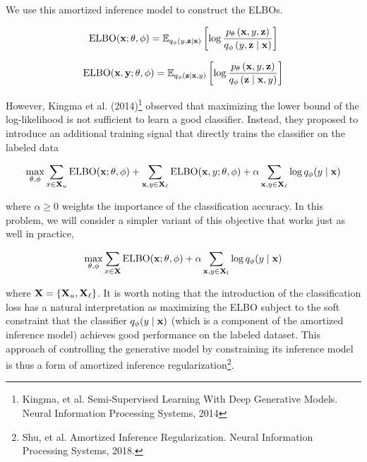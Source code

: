 We use this amortized inference model to construct the ELBOs.

\begin{equation} \label{eq:24}
    \text{ELBO}(\mathbf{x}; \theta, \phi) = \mathbb{E}_{q_{\phi}(y,\mathbf{z} \mid \mathbf{x})} \left[\log \frac{p_{\theta}\left(\mathbf{x},y,\mathbf{z}\right)}{q_{\phi}\left(y,\mathbf{z} \mid \mathbf{x}\right)}\right]
\end{equation}

\begin{equation} \label{eq:25}
    \text{ELBO}(\mathbf{x}, \mathbf{y}; \theta, \phi) = \mathbb{E}_{q_{\phi}(\mathbf{z} \mid \mathbf{x}, y)} \left[\log \frac{p_{\theta}\left(\mathbf{x},y,\mathbf{z}\right)}{q_{\phi}\left(\mathbf{z} \mid \mathbf{x}, y\right)}\right]
\end{equation}

However, Kingma et al. (2014)\footnote{Kingma, et al. Semi-Supervised Learning With Deep Generative Models. Neural Information Processing Systems, 2014} 
observed that maximizing the lower bound of the log-likelihood is not sufficient to learn a good classifier. Instead, they proposed 
to introduce an additional training signal that directly trains the classifier on the labeled data

\begin{equation} \label{eq:26}
    \max\limits_{\theta, \phi} \sum\limits_{x\in\mathbf{X}_u} \text{ELBO}(\mathbf{x}; \theta, \phi) + \sum\limits_{\mathbf{x},y \in \mathbf{X}_{\ell}} \text{ELBO}(\mathbf{x},y;\theta,\phi) + \alpha \sum\limits_{\mathbf{x},y \in \mathbf{X}_{\ell}} \log q_{\phi}(y \mid \mathbf{x})
\end{equation}

where $\alpha \ge 0$ weights the importance of the classification accuracy. In this problem, we will consider a simpler variant of this objective that works just as well in practice,

\begin{equation} \label{eq:27}
    \max\limits_{\theta, \phi} \sum\limits_{x \in \mathbf{X}} \text{ELBO}(\mathbf{x}; \theta, \phi) + \alpha \sum\limits_{\mathbf{x},y \in \mathbf{X}_l} \log q_{\phi}(y \mid \mathbf{x})
\end{equation}

where $\mathbf{X} = \{\mathbf{X}_u, \mathbf{X}_{\ell}\}$. It is worth noting that the introduction of the classification loss has a natural interpretation as maximizing 
the ELBO subject to the soft constraint that the classifier $q_{\phi}(y\mid\mathbf{x})$ (which is a component of the amortized inference model) 
achieves good performance on the labeled dataset. This approach of controlling the generative model by constraining its inference model 
is thus a form of amortized inference regularization\footnote{Shu, et al. Amortized Inference Regularization. Neural Information Processing Systems, 2018.}.

